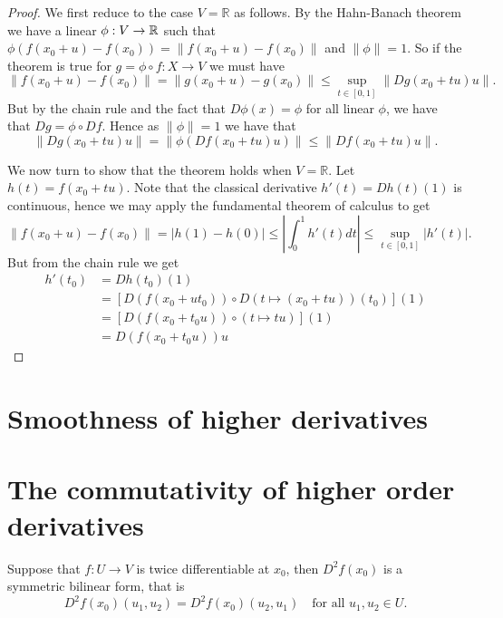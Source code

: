 \documentclass[twoside, a4paper, 10pt]{amsart}
\begin{document}
\begin{proof} We first reduce to the case $V = \mathbb{R}$ as follows. By the Hahn-Banach theorem we have a linear $\phi:V \to \mathbb{R}$ such that $\phi (f(x_0 + u) - f(x_0)) = \| f(x_0 + u) - f(x_0) \|$ and $\|\phi \| = 1$. So if the theorem is true for $g = \phi \circ f: X \to V$ we must have $$\|f(x_0+ u) -f(x_0)\| = \|g(x_0 + u) - g(x_0) \| \leq \sup_{t \in [0,1]} \| Dg(x_0 + tu) u \|.$$ But by the chain rule and the fact that $D\phi(x) = \phi$ for all linear $\phi$, we have that $Dg = \phi \circ Df$. Hence as $\|\phi \| = 1$ we have that $$\|Dg(x_0 +tu)u \| = \| \phi \left( Df(x_0+tu)u \right) \| \leq \|Df(x_0+tu)u \|.$$ 

We now turn to show that the theorem holds when $V = \mathbb{R}$. Let $h(t) = f(x_0+tu)$. Note that the classical derivative $h'(t) = Dh(t) (1)$ is continuous, hence we may apply the fundamental theorem of calculus to get $$\| f(x_0 + u) - f(x_0) \| = |h(1) - h(0)| \leq |\int_{0}^1 h'(t) dt| \leq \sup_{t \in [0,1]}|h'(t)|.$$ But from the chain rule we get
\begin{align*} 
h'(t_0) &= Dh(t_0)(1) \\ 
&= \left[ D(f(x_0 + ut_0)) \circ D(t \mapsto (x_0 + tu))(t_0) \right](1) \\ 
&= \left[ D(f(x_0+t_0u)) \circ (t \mapsto tu) \right] (1) \\
&=D(f(x_0+t_0u)) u  \end{align*} \end{proof}

\section{Smoothness of higher derivatives}

\section{The commutativity of higher order derivatives}

\begin{thm} Suppose that $f:U \to V$ is twice differentiable at $x_0$, then $D^2 f(x_0)$ is a symmetric bilinear form, that is $$D^2f(x_0)(u_1,u_2) = D^2f(x_0)(u_2,u_1) \quad \text{for all } u_1,u_2 \in U.$$  \end{thm}
\end{document}
